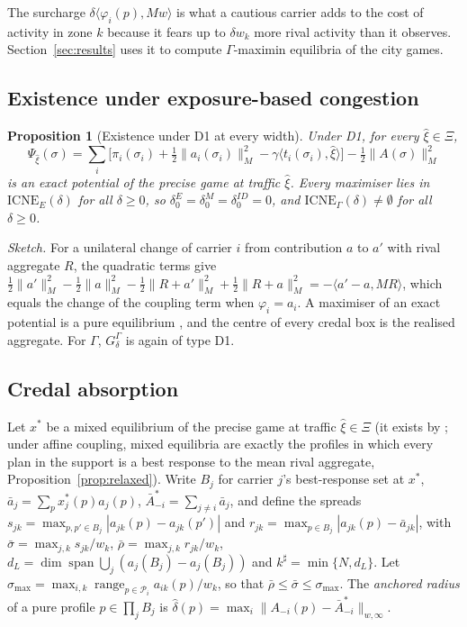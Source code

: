 \documentclass[preprint,12pt]{elsarticle}
\newtheorem{proposition}[theorem]{Proposition}
\theoremstyle{definition}
\theoremstyle{remark}
\newcommand{\cP}{\mathcal{P}}
\newcommand{\abar}{\bar a}
\newcommand{\Abar}{\bar A}
\newcommand{\spn}{\operatorname{span}}
\newcommand{\ICNE}{\mathrm{ICNE}}
\newcommand{\ip}[2]{\langle #1,#2\rangle}
\begin{document}
The surcharge $\delta\ip{\varphi_i(p)}{Mw}$ is what a cautious carrier adds to the cost of activity in zone $k$ because it fears up to $\delta w_k$ more rival activity than it observes. Section~\ref{sec:results} uses it to compute $\Gamma$-maximin equilibria of the city games.

\subsection{Existence under exposure-based congestion}

\begin{proposition}[Existence under D1 at every width]\label{prop:D1}
Under D1, for every $\hat\xi\in\Xi$,
\[
\Psi_{\hat\xi}(\sigma)=\textstyle\sum_i\big[\pi_i(\sigma_i)+\tfrac12\|a_i(\sigma_i)\|_M^2-\gamma\ip{t_i(\sigma_i)}{\hat\xi}\big]-\tfrac12\|A(\sigma)\|_M^2
\]
is an exact potential of the precise game at traffic $\hat\xi$. Every maximiser lies in $\ICNE_E(\delta)$ for all $\delta\ge0$, so $\delta_0^E=\delta_0^M=\delta_0^{ID}=0$, and $\ICNE_\Gamma(\delta)\neq\emptyset$ for all $\delta\ge0$.
\end{proposition}

\emph{Sketch.} For a unilateral change of carrier $i$ from contribution $a$ to $a'$ with rival aggregate $R$, the quadratic terms give $\tfrac12\|a'\|_M^2-\tfrac12\|a\|_M^2-\tfrac12\|R+a'\|_M^2+\tfrac12\|R+a\|_M^2=-\ip{a'-a}{MR}$, which equals the change of the coupling term when $\varphi_i=a_i$. A maximiser of an exact potential is a pure equilibrium \citep{Monderer1996}, and the centre of every credal box is the realised aggregate. For $\Gamma$, $G^\Gamma_\delta$ is again of type D1.

\subsection{Credal absorption}

Let $x^*$ be a mixed equilibrium of the precise game at traffic $\hat\xi\in\Xi$ (it exists by \citealp{Nash1951}; under affine coupling, mixed equilibria are exactly the profiles in which every plan in the support is a best response to the mean rival aggregate, Proposition~\ref{prop:relaxed}). Write $B_j$ for carrier $j$'s best-response set at $x^*$, $\abar_j=\sum_px^*_j(p)a_j(p)$, $\Abar^*_{-i}=\sum_{j\ne i}\abar_j$, and define the spreads $s_{jk}=\max_{p,p'\in B_j}|a_{jk}(p)-a_{jk}(p')|$ and $r_{jk}=\max_{p\in B_j}|a_{jk}(p)-\abar_{jk}|$, with $\bar\sigma=\max_{j,k}s_{jk}/w_k$, $\bar\rho=\max_{j,k}r_{jk}/w_k$, $d_L=\dim\spn\bigcup_j(a_j(B_j)-a_j(B_j))$ and $k^\sharp=\min\{N,d_L\}$. Let $\sigma_{\max}=\max_{i,k}\operatorname{range}_{p\in\cP_i}a_{ik}(p)/w_k$, so that $\bar\rho\le\bar\sigma\le\sigma_{\max}$. The \emph{anchored radius} of a pure profile $p\in\prod_jB_j$ is $\hat\delta(p)=\max_i\|A_{-i}(p)-\Abar^*_{-i}\|_{w,\infty}$.
\end{document}
